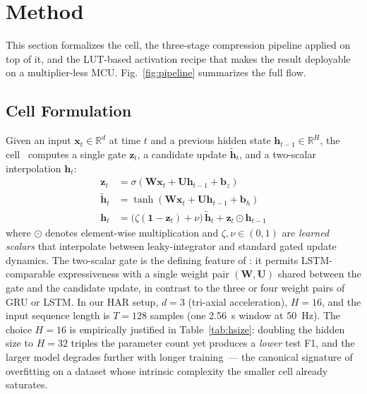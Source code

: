 \section{Method}
\label{sec:method}

This section formalizes the \fastgrnn{} cell, the three-stage
compression pipeline applied on top of it, and the LUT-based
activation recipe that makes the result deployable on a
multiplier-less MCU. Fig.~\ref{fig:pipeline} summarizes the full
flow.

\subsection{\fastgrnn{} Cell Formulation}
\label{sec:method:cell}

Given an input $\mathbf{x}_t \in \mathbb{R}^{d}$ at time $t$ and a
previous hidden state $\mathbf{h}_{t-1} \in \mathbb{R}^{H}$, the
\fastgrnn{} cell~\cite{kusupati2018fastgrnn} computes a single gate
$\mathbf{z}_t$, a candidate update $\tilde{\mathbf{h}}_t$, and a
two-scalar interpolation $\mathbf{h}_t$:
\begin{align}
\mathbf{z}_t &= \sigma(\mathbf{W} \mathbf{x}_t + \mathbf{U} \mathbf{h}_{t-1} + \mathbf{b}_z) \label{eq:z}\\
\tilde{\mathbf{h}}_t &= \tanh(\mathbf{W} \mathbf{x}_t + \mathbf{U} \mathbf{h}_{t-1} + \mathbf{b}_h) \label{eq:htilde}\\
\mathbf{h}_t &= \bigl(\zeta(\mathbf{1} - \mathbf{z}_t) + \nu\bigr)\, \tilde{\mathbf{h}}_t + \mathbf{z}_t \odot \mathbf{h}_{t-1} \label{eq:hupdate}
\end{align}
where $\odot$ denotes element-wise multiplication and
$\zeta, \nu \in (0,1)$ are \emph{learned scalars} that interpolate
between leaky-integrator and standard gated update dynamics. The
two-scalar gate is the defining feature of \fastgrnn{}: it permits
LSTM-comparable expressiveness with a single weight pair
$(\mathbf{W}, \mathbf{U})$ shared between the gate and the candidate
update, in contrast to the three or four weight pairs of GRU or
LSTM. In our HAR setup, $d{=}3$ (tri-axial acceleration), $H{=}16$,
and the input sequence length is $T{=}128$ samples (one 2.56~s
window at 50~Hz). The choice $H{=}16$ is empirically justified in
Table~\ref{tab:hsize}: doubling the hidden size to $H{=}32$
triples the parameter count yet produces a \emph{lower} test F1,
and the larger model degrades further with longer training~--- the
canonical signature of overfitting on a dataset whose intrinsic
complexity the smaller cell already saturates.

